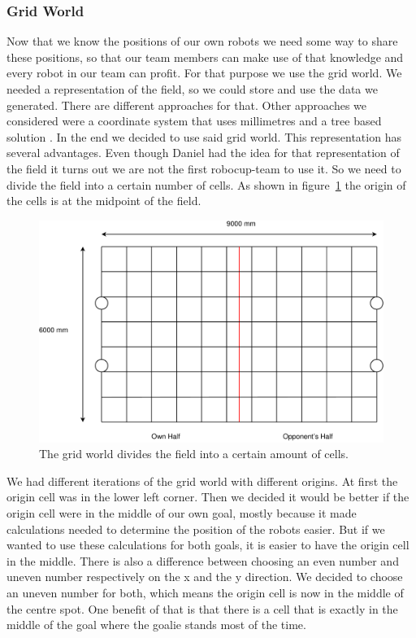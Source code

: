 \documentclass[lnicst,a4paper]{svmultln}
\begin{document}
\subsubsection{Grid World}
Now that we know the positions of our own robots we need some way to share these positions, so that our team members can make use of that knowledge and every robot in our team can profit. For that purpose we use the grid world. We needed a representation of the field, so we could store and use the data we generated. There are different approaches for that. Other approaches we considered were a coordinate system that uses millimetres and a tree based solution \cite{tree}. In the end we decided to use said grid world. This representation has several advantages. Even though Daniel had the idea for that representation of the field it turns out we are not the first robocup-team to use it. \cite{grid} So we need to divide the field into a certain number of cells. As shown in figure~\ref{fig:gridworld} the origin of the cells is at the midpoint of the field.
\begin{figure}
 	\centerline{\includegraphics[width=1\textwidth]{gridworld.pdf}}
	{\caption{The grid world divides the field into a certain amount of cells.}\label{fig:gridworld}}
\end{figure}
We had different iterations of the grid world with different origins. At first the origin cell was in the lower left corner. Then we decided it would be better if the origin cell were in the middle of our own goal, mostly because it made calculations needed to determine the position of the robots easier. But if we wanted to use these calculations for both goals, it is easier to have the origin cell in the middle. There is also a difference between choosing an even number and uneven number respectively on the x and the y direction. We decided to choose an uneven number for both, which means the origin cell is now in the middle of the centre spot. One benefit of that is that there is a cell that is exactly in the middle of the goal where the goalie stands most of the time. 
\end{document}
